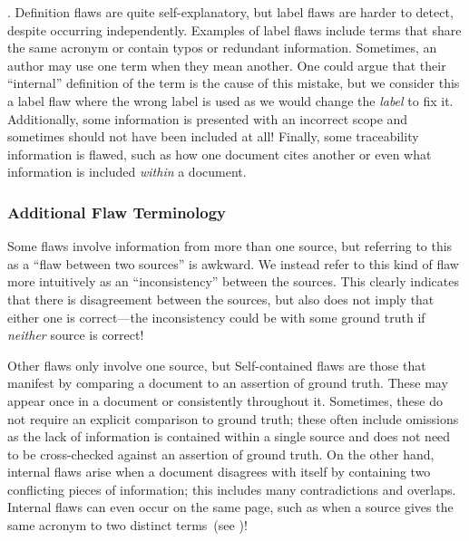 \label{label-flaw-def}
. Definition flaws are quite self-explanatory, but
label flaws are harder to detect, despite occurring independently. Examples of
label flaws include terms that share the same acronym or contain typos or
redundant information. Sometimes, an author may use one term when they mean
another. One could argue that their ``internal'' definition of the term is the
cause of this mistake, but we consider this a label flaw where the wrong
label is used as we would change the \emph{label} to fix it.
\label{scope-flaw-def}%
Additionally, some information is presented with an incorrect scope and
sometimes should not have been included at all!
\label{trace-flaw-def}%
Finally, some traceability information is flawed, such as how one document
cites another or even what information is included \emph{within} a document.

\subsubsection{Additional Flaw Terminology}\label{add-flaw-terms}
Some flaws involve information from more than one source, but referring to this
as a ``flaw between two sources'' is awkward. We instead
refer to this kind of flaw more intuitively as an ``inconsistency'' between the
sources. This clearly indicates that there is disagreement between
the sources, but also does not imply that either one is correct---the
inconsistency could be with some ground truth if \emph{neither} source is
correct!

\label{one-src-flaws}
Other flaws only involve one source, but \oneSrcDistinct{}
Self-contained flaws are those that manifest by comparing a document to an
assertion of ground truth. These may appear once in a document or consistently
throughout it. Sometimes, these do not require an explicit comparison to ground
truth; these often include omissions as the lack of information is
contained within a single source and does not need to be cross-checked against
an assertion of ground truth. On the other hand, internal flaws arise when a
document disagrees with itself by containing two conflicting pieces of
information; this includes many contradictions and overlaps. Internal flaws can
even occur on the same page, such as when a source gives the same acronym to
two distinct terms\ifnotpaper\ (see )\fi!

